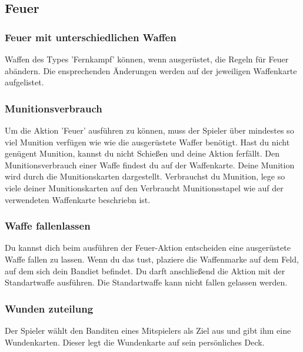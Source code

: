 \subsection{Feuer}

\subsubsection{Feuer mit unterschiedlichen Waffen}
Waffen des Types 'Fernkampf' können, wenn ausgerüstet, die Regeln für Feuer abändern. Die ensprechenden
Änderungen werden auf der jeweiligen Waffenkarte aufgelistet.

\subsubsection{Munitionsverbrauch}
Um die Aktion 'Feuer' ausführen zu können, muss der Spieler über mindestes so viel Munition verfügen wie
wie die ausgerüstete Waffer benötigt. Hast du nicht genügent Munition, kannst du nicht Schießen und deine Aktion ferfällt.
Den Munitionsverbrauch einer Waffe findest du auf der Waffenkarte.
Deine Munition wird durch die Munitionskarten dargestellt. Verbrauchst du Munition, lege so viele deiner Munitionskarten
auf den Verbraucht Munitionsstapel wie auf der verwendeten Waffenkarte beschriebn ist.

\subsubsection{Waffe fallenlassen}
Du kannst dich beim ausführen der Feuer-Aktion entscheiden eine ausgerüstete Waffe fallen zu lassen. Wenn du das tust,
plaziere die Waffenmarke auf dem Feld, auf dem sich dein Bandiet befindet. Du darft anschließend die Aktion mit der
Standartwaffe ausführen. Die Standartwaffe kann nicht fallen gelassen werden.

\subsubsection{Wunden zuteilung}
Der Spieler wählt den Banditen eines Mitspielers als
Ziel aus und gibt ihm eine Wundenkarten. Dieser legt die Wundenkarte auf sein persönliches
Deck.